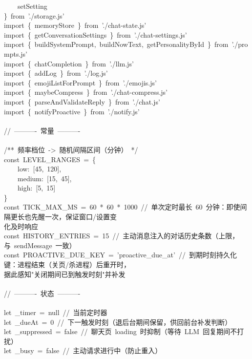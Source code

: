 \documentclass[a4paper,10pt]{article}
\begin{document}
{\ttfamily\footnotesize\raggedright
~~~~setSetting\\
\}~from~'./storage.js'\\
import~\{~memoryStore~\}~from~'./chat-state.js'\\
import~\{~getConversationSettings~\}~from~'./chat-settings.js'\\
import~\{~buildSystemPrompt,~buildNowText,~getPersonalityById~\}~from~'./prompts.js'\\
import~\{~chatCompletion~\}~from~'./llm.js'\\
import~\{~addLog~\}~from~'./log.js'\\
import~\{~emojiListForPrompt~\}~from~'./emojis.js'\\
import~\{~maybeCompress~\}~from~'./chat-compress.js'\\
import~\{~parseAndValidateReply~\}~from~'./chat.js'\\
import~\{~notifyProactive~\}~from~'./notify.js'\\
\mbox{}\\
//~----------~常量~----------\\
\mbox{}\\
/**~频率档位~->~随机间隔区间（分钟）~*/\\
const~LEVEL\_RANGES~=~\{\\
~~~~low:~[45,~120],\\
~~~~medium:~[15,~45],\\
~~~~high:~[5,~15]\\
\}\\
const~TICK\_MAX\_MS~=~60~*~60~*~1000~//~单次定时最长~60~分钟：即使间隔更长也先醒一次，保证窗口/设置变\\
化及时响应\\
const~HISTORY\_ENTRIES~=~15~//~主动消息注入的对话历史条数（上限，与~sendMessage~一致）\\
const~PROACTIVE\_DUE\_KEY~=~'proactive\_due\_at'~//~到期时刻持久化键：进程结束（关页/杀进程）后重开时，\\
据此感知"关闭期间已到触发时刻"并补发\\
\mbox{}\\
//~----------~状态~----------\\
\mbox{}\\
let~\_timer~=~null~//~当前定时器\\
let~\_dueAt~=~0~//~下一触发时刻（退后台期间保留，供回前台补发判断）\\
let~\_suppressed~=~false~//~聊天页~loading~时抑制（等待~LLM~回复期间不打扰）\\
let~\_busy~=~false~//~主动请求进行中（防止重入）\\
}
\end{document}
